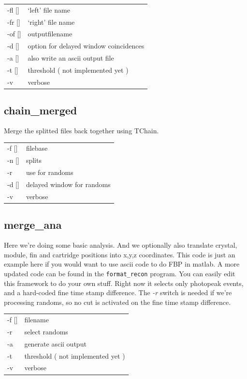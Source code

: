 \documentclass[12pt]{article}
\begin{document}
\begin{tabular}{ll}
-fl [] & `left' file name\\
-fr [] & `right' file name\\
-of [] & outputfilename \\
-d [] & option for delayed window coincidences\\
-a [] & also write an ascii output file\\
-t [] & threshold ( not implemented yet ) \\
-v & verbose\\
\end{tabular}

\subsection{chain\_merged}
Merge the splitted files back together using TChain.\\

\begin{tabular}{ll}
-f [] & filebase\\
-n [] & splits\\
-r & use for randoms \\
-d [] & delayed window for randoms\\ 
-v & verbose\\
\end{tabular}

\subsection{merge\_ana}
Here we're doing some basic analysis. And we optionally also translate crystal, module, fin and cartridge positions into x,y,z coordinates. This code is just an example here if you would want to use ascii code to do FBP in matlab. A more updated code can be found in the {\tt format\_recon} program. You can easily edit this framework to do your own stuff. Right now it selects only photopeak events, and a hard-coded fine time stamp difference. The {\em -r} switch is needed if we're processing randoms, so no cut is activated on the fine time stamp difference. \\

\begin{tabular}{ll}
-f [] & filename \\
-r & select randoms\\ 
-a & generate ascii output\\
-t & threshold ( not implemented yet ) \\
-v & verbose\\
\end{tabular}
\end{document}
